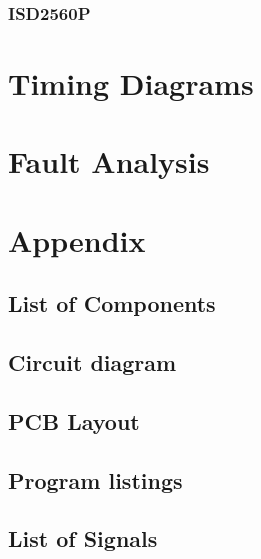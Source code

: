 \documentclass[a4paper,11pt]{article}
\begin{document}
		\subsubsection{ISD2560P}

\section{Timing Diagrams}

\section{Fault Analysis}

\section{Appendix}

	\subsection{List of Components}

	\subsection{Circuit diagram}

	\subsection{PCB Layout}

	\subsection{Program listings}

	\subsection{List of Signals}
\end{document}
